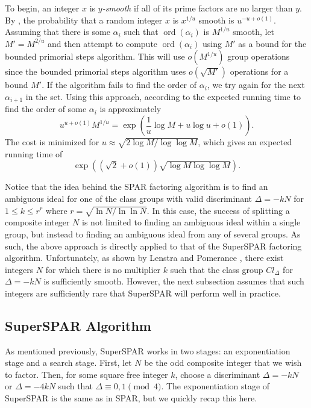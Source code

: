 \documentclass{ucalgthes1}
\theoremstyle{definition}
\DeclareMathOperator{\ord}{ord}
\begin{document}
To begin, an integer $x$ is \emph{$y$-smooth} if all of its prime factors are no larger than $y$.  By \cite[p.81]{Sutherland2007}, the probability that a random integer $x$ is $x^{1/u}$ smooth is $u^{-u+o(1)}$.  Assuming that there is some $\alpha_i$ such that $\ord(\alpha_i)$ is $M^{1/u}$ smooth, let $M'=M^{2/u}$ and then attempt to compute $\ord(\alpha_i)$ using $M'$ as a bound for the bounded primorial steps algorithm.  This will use $o(M^{1/u})$ group operations since the bounded primorial steps algorithm uses $o(\sqrt{M'})$ operations for a bound $M'$.  If the algorithm fails to find the order of $\alpha_i$, we try again for the next $\alpha_{i+1}$ in the set.  Using this approach, according to \cite[pp.81--82]{Sutherland2007} the expected running time to find the order of some $\alpha_i$ is approximately
\[
	u^{u+o(1)}M^{1/u} = \exp \left( \frac{1}{u}\log M + u \log u + o(1) \right).
\]
The cost is minimized for $u \approx \sqrt{2 \log M / \log \log M}$, which gives an expected running time of
\[
	\exp \left( \left( \sqrt2 + o(1) \right) \sqrt{\log M \log \log M} \right).
\]

Notice that the idea behind the SPAR factoring algorithm is to find an ambiguous ideal for one of the class groups with valid discriminant $\Delta = -kN$ for $1 \le k \le r^r$ where $r = \sqrt{\ln N / \ln \ln N}$.  In this case, the success of splitting a composite integer $N$ is not limited to finding an ambiguous ideal within a single group, but instead to finding an ambiguous ideal from any of several groups.  As such, the above approach is directly applied to that of the SuperSPAR factoring algorithm.  Unfortunately, as shown by Lenstra and Pomerance \mbox{\cite[\S~11]{Lenstra1992}}, there exist integers $N$ for which there is no multiplier $k$ such that the class group $Cl_\Delta$ for $\Delta = -kN$ is sufficiently smooth.  However, the next subsection assumes that such integers are sufficiently rare that SuperSPAR will perform well in practice.


\subsection{SuperSPAR Algorithm}
\label{subsec:ssparAlg}

As mentioned previously, SuperSPAR works in two stages: an exponentiation stage and a search stage.  First, let $N$ be the odd composite integer that we wish to factor.  Then, for some square free integer $k$, choose a discriminant $\Delta = -kN$ or $\Delta = -4kN$ such that $\Delta \equiv 0, 1 \pmod 4$.  The exponentiation stage of SuperSPAR is the same as in SPAR, but we quickly recap this here.
\end{document}
